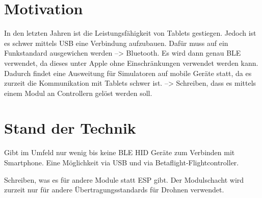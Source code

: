 \section{Motivation}

In den letzten Jahren ist die Leistungsfähigkeit von Tablets gestiegen. Jedoch ist es schwer mittels USB eine Verbindung aufzubauen. Dafür muss auf ein Funkstandard ausgewichen werden --> Bluetooth.
Es wird dann genau BLE verwendet, da dieses unter Apple ohne Einschränkungen verwendet werden kann.
Dadurch findet eine Ausweitung für Simulatoren auf mobile Geräte statt, da es zurzeit die Kommunikation mit Tablets schwer ist.
--> Schreiben, dass es mittels einem Modul an Controllern gelöst werden soll.

\section{Stand der Technik}

Gibt im Umfeld nur wenig bis keine BLE HID Geräte zum Verbinden mit Smartphone. Eine Möglichkeit via USB und via Betaflight-Flightcontroller.

Schreiben, was es für andere Module statt ESP gibt. Der Modulschacht wird zurzeit nur für andere Übertragungsstandards für Drohnen verwendet.